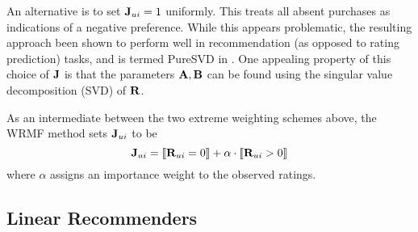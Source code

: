 An alternative is to set $\mathbf{J}_{ui} = 1$ uniformly. This treats all absent purchases as indications of a negative preference. 
While this appears problematic, the resulting approach been shown to perform well in recommendation (as opposed to rating prediction) tasks, and is termed PureSVD in \citep{Cremonesi:2010}.
One appealing property of this choice of $\mathbf{J}$ is that the parameters $\mathbf{A}, \mathbf{B}$ can be found using the singular value decomposition (SVD) of $\mathbf{R}$. 


%

As an intermediate between the two extreme weighting schemes above, the WRMF method \citep{Pan:2008} sets $\mathbf{J}_{ui}$ to be
\begin{equation}
\label{eqn:wrmf-weight}
\mathbf{J}_{ui} =  \llbracket  \mathbf{R}_{ui} = 0  \rrbracket + \alpha \cdot \llbracket  \mathbf{R}_{ui} > 0  \rrbracket 
\end{equation}
where $\alpha$ assigns an importance weight to the observed ratings. 


\subsection{Linear Recommenders}

